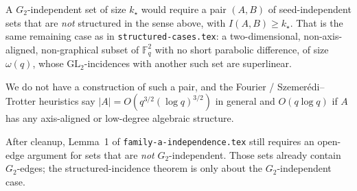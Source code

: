 \documentclass[11pt]{article}
\theoremstyle{definition}
\newcommand{\F}{\mathbb{F}}
\begin{document}
A $G_2$-independent set of size $k_{\star}$ would require a pair $(A,B)$ of seed-independent sets that are \emph{not} structured in the sense above, with $I(A,B)\ge k_{\star}$.
That is the same remaining case as in \texttt{structured-cases.tex}: a two-dimensional, non-axis-aligned, non-graphical subset of $\F_q^{2}$ with no short parabolic difference, of size $\omega(q)$, whose $\mathrm{GL}_2$-incidences with another such set are superlinear.

We do not have a construction of such a pair, and the Fourier / Szemer\'edi--Trotter heuristics say $|A|=O(q^{3/2}(\log q)^{3/2})$ in general and $O(q\log q)$ if $A$ has any axis-aligned or low-degree algebraic structure.

After cleanup, Lemma~1 of \texttt{family-a-independence.tex} still requires an open-edge argument for sets that are \emph{not} $G_2$-independent.
Those sets already contain $G_2$-edges; the structured-incidence theorem is only about the $G_2$-independent case.
\end{document}
